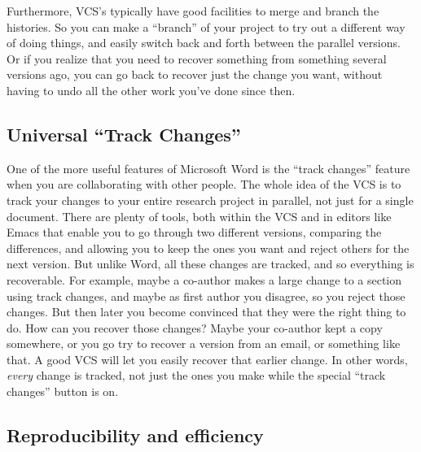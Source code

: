 \documentclass[11pt]{article}
\begin{document}
Furthermore, VCS's typically have good facilities to merge and branch the histories. So you can make a ``branch'' of your project to try out a different way of doing things, and easily switch back and forth between the parallel versions.  Or if you realize that you need to recover something from something several versions ago, you can go back to recover just the change you want, without having to undo all the other work you've done since then.
\subsection{Universal ``Track Changes''}
\label{sec-2-3}

One of the more useful features of Microsoft Word is the ``track changes'' feature when you are collaborating with other people.  The whole idea of the VCS is to track your changes to your entire research project in parallel, not just for a single document. There are plenty of tools, both within the VCS and in editors like Emacs that enable you to go through two different versions, comparing the differences, and allowing you to keep the ones you want and reject others for the next version.  But unlike Word, all these changes are tracked, and so everything is recoverable. For example, maybe a co-author makes a large change to a section using track changes, and maybe as first author you disagree, so you reject those changes. But then later you become convinced that they were the right thing to do.  How can you recover those changes?  Maybe your co-author kept a copy somewhere, or you go try to recover a version from an email, or something like that. A good VCS will let you easily recover that earlier change.  In other words, \emph{every} change is tracked, not just the ones you make while the special ``track changes'' button is on.
\subsection{Reproducibility and efficiency}
\label{sec-2-4}
\end{document}
